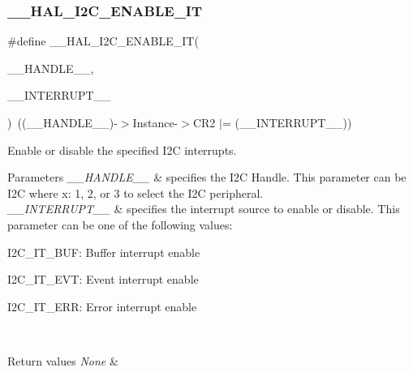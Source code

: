 \subsubsection{\texorpdfstring{\+\_\+\+\_\+\+H\+A\+L\+\_\+\+I2\+C\+\_\+\+E\+N\+A\+B\+L\+E\+\_\+\+IT}{\_\_HAL\_I2C\_ENABLE\_IT}}
{\footnotesize\ttfamily \#define \+\_\+\+\_\+\+H\+A\+L\+\_\+\+I2\+C\+\_\+\+E\+N\+A\+B\+L\+E\+\_\+\+IT(\begin{DoxyParamCaption}\item[{}]{\+\_\+\+\_\+\+H\+A\+N\+D\+L\+E\+\_\+\+\_\+,  }\item[{}]{\+\_\+\+\_\+\+I\+N\+T\+E\+R\+R\+U\+P\+T\+\_\+\+\_\+ }\end{DoxyParamCaption})~((\+\_\+\+\_\+\+H\+A\+N\+D\+L\+E\+\_\+\+\_\+)-\/$>$Instance-\/$>$C\+R2 $\vert$= (\+\_\+\+\_\+\+I\+N\+T\+E\+R\+R\+U\+P\+T\+\_\+\+\_\+))}



Enable or disable the specified I2C interrupts. 


\begin{DoxyParams}{Parameters}
{\em \+\_\+\+\_\+\+H\+A\+N\+D\+L\+E\+\_\+\+\_\+} & specifies the I2C Handle. This parameter can be I2C where x\+: 1, 2, or 3 to select the I2C peripheral. \\
\hline
{\em \+\_\+\+\_\+\+I\+N\+T\+E\+R\+R\+U\+P\+T\+\_\+\+\_\+} & specifies the interrupt source to enable or disable. This parameter can be one of the following values\+: \begin{DoxyItemize}
\item I2\+C\+\_\+\+I\+T\+\_\+\+B\+UF\+: Buffer interrupt enable \item I2\+C\+\_\+\+I\+T\+\_\+\+E\+VT\+: Event interrupt enable \item I2\+C\+\_\+\+I\+T\+\_\+\+E\+RR\+: Error interrupt enable \end{DoxyItemize}
\\
\hline
\end{DoxyParams}

\begin{DoxyRetVals}{Return values}
{\em None} & \\
\hline
\end{DoxyRetVals}
\mbox{\label{group___i2_c___exported___macros_gafbdf01a7dc3183de7af56456cab93551}} 
